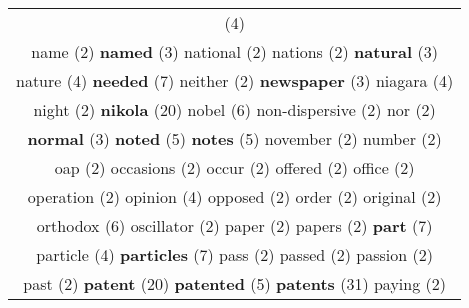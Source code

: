 \documentclass[12pt,a4paper]{article}
\begin{document}
\begin{center}
\begin{longtable}{|c|}
\footnotesize{(4)}  \\ {\footnotesize \textcolor{Verde} {name}} \footnotesize{(2)} {\small \textcolor{Laranja} {\bf named}} \footnotesize{(3)} {\footnotesize \textcolor{Verde} {national}} \footnotesize{(2)} {\footnotesize \textcolor{Verde} {nations}} \footnotesize{(2)} {\small \textcolor{Laranja} {\bf natural}} \footnotesize{(3)}  \\ {\normalsize \textcolor{VerdeLocao} {nature}} \footnotesize{(4)} {\LARGE \textcolor{Rosa} {\bf needed}} \footnotesize{(7)} {\footnotesize \textcolor{Verde} {neither}} \footnotesize{(2)} {\small \textcolor{Laranja} {\bf newspaper}} \footnotesize{(3)} {\normalsize \textcolor{VerdeLocao} {niagara}} \footnotesize{(4)}  \\ {\footnotesize \textcolor{Verde} {night}} \footnotesize{(2)} {\Huge \textcolor{AzulEscuro} {\bf nikola}} \footnotesize{(20)} {\Large \textcolor{VermEscuro} {nobel}} \footnotesize{(6)} {\footnotesize \textcolor{Verde} {non-dispersive}} \footnotesize{(2)} {\footnotesize \textcolor{Verde} {nor}} \footnotesize{(2)}  \\ {\small \textcolor{Laranja} {\bf normal}} \footnotesize{(3)} {\large \textcolor{Roxo} {\bf noted}} \footnotesize{(5)} {\large \textcolor{Roxo} {\bf notes}} \footnotesize{(5)} {\footnotesize \textcolor{Verde} {november}} \footnotesize{(2)} {\footnotesize \textcolor{Verde} {number}} \footnotesize{(2)}  \\ {\footnotesize \textcolor{Verde} {oap}} \footnotesize{(2)} {\footnotesize \textcolor{Verde} {occasions}} \footnotesize{(2)} {\footnotesize \textcolor{Verde} {occur}} \footnotesize{(2)} {\footnotesize \textcolor{Verde} {offered}} \footnotesize{(2)} {\footnotesize \textcolor{Verde} {office}} \footnotesize{(2)}  \\ {\footnotesize \textcolor{Verde} {operation}} \footnotesize{(2)} {\normalsize \textcolor{VerdeLocao} {opinion}} \footnotesize{(4)} {\footnotesize \textcolor{Verde} {opposed}} \footnotesize{(2)} {\footnotesize \textcolor{Verde} {order}} \footnotesize{(2)} {\footnotesize \textcolor{Verde} {original}} \footnotesize{(2)}  \\ {\Large \textcolor{VermEscuro} {orthodox}} \footnotesize{(6)} {\footnotesize \textcolor{Verde} {oscillator}} \footnotesize{(2)} {\footnotesize \textcolor{Verde} {paper}} \footnotesize{(2)} {\footnotesize \textcolor{Verde} {papers}} \footnotesize{(2)} {\LARGE \textcolor{Rosa} {\bf part}} \footnotesize{(7)}  \\ {\normalsize \textcolor{VerdeLocao} {particle}} \footnotesize{(4)} {\LARGE \textcolor{Rosa} {\bf particles}} \footnotesize{(7)} {\footnotesize \textcolor{Verde} {pass}} \footnotesize{(2)} {\footnotesize \textcolor{Verde} {passed}} \footnotesize{(2)} {\footnotesize \textcolor{Verde} {passion}} \footnotesize{(2)}  \\ {\footnotesize \textcolor{Verde} {past}} \footnotesize{(2)} {\Huge \textcolor{AzulEscuro} {\bf patent}} \footnotesize{(20)} {\large \textcolor{Roxo} {\bf patented}} \footnotesize{(5)} {\Huge \textcolor{AzulEscuro} {\bf patents}} \footnotesize{(31)} {\footnotesize \textcolor{Verde} {paying}} \footnotesize{(2)}  \\ 
\end{longtable}
\end{center}
\end{document}
